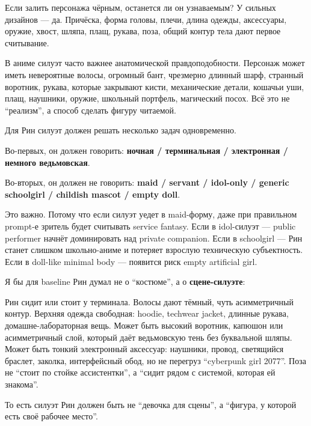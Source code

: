Если залить персонажа чёрным, останется ли он узнаваемым? У сильных
дизайнов --- да. Причёска, форма головы, плечи, длина одежды,
аксессуары, оружие, хвост, шляпа, плащ, рукава, поза, общий контур тела
дают первое считывание.

В аниме силуэт часто важнее анатомической правдоподобности. Персонаж
может иметь невероятные волосы, огромный бант, чрезмерно длинный шарф,
странный воротник, рукава, которые закрывают кисти, механические детали,
кошачьи уши, плащ, наушники, оружие, школьный портфель, магический
посох. Всё это не ``реализм'', а способ сделать фигуру читаемой.

Для Рин силуэт должен решать несколько задач одновременно.

Во-первых, он должен говорить: \textbf{ночная /\hspace{0pt} терминальная /\hspace{0pt}
электронная /\hspace{0pt} немного ведьмовская}.

Во-вторых, он должен не говорить: \textbf{maid /\hspace{0pt} servant /\hspace{0pt} idol-only /\hspace{0pt}
generic schoolgirl /\hspace{0pt} childish mascot /\hspace{0pt} empty doll}.

Это важно. Потому что если силуэт уедет в maid-форму, даже при
правильном prompt-е зритель будет считывать service fantasy. Если в
idol-силуэт --- public performer начнёт доминировать над private
companion. Если в schoolgirl --- Рин станет слишком школьно-аниме и
потеряет взрослую техническую субъектность. Если в doll-like minimal
body --- появится риск empty artificial girl.

Я бы для baseline Рин думал не о ``костюме'', а о
\textbf{сцене-силуэте}:

Рин сидит или стоит у терминала. Волосы дают тёмный, чуть асимметричный
контур. Верхняя одежда свободная: hoodie, techwear jacket, длинные
рукава, домашне-лабораторная вещь. Может быть высокий воротник, капюшон
или асимметричный слой, который даёт ведьмовскую тень без буквальной
шляпы. Может быть тонкий электронный аксессуар: наушники, провод,
светящийся браслет, заколка, интерфейсный обод, но не перегруз
``cyberpunk girl 2077''. Поза не ``стоит по стойке ассистентки'', а
``сидит рядом с системой, которая ей знакома''.

То есть силуэт Рин должен быть не ``девочка для сцены'', а ``фигура, у
которой есть своё рабочее место''.

